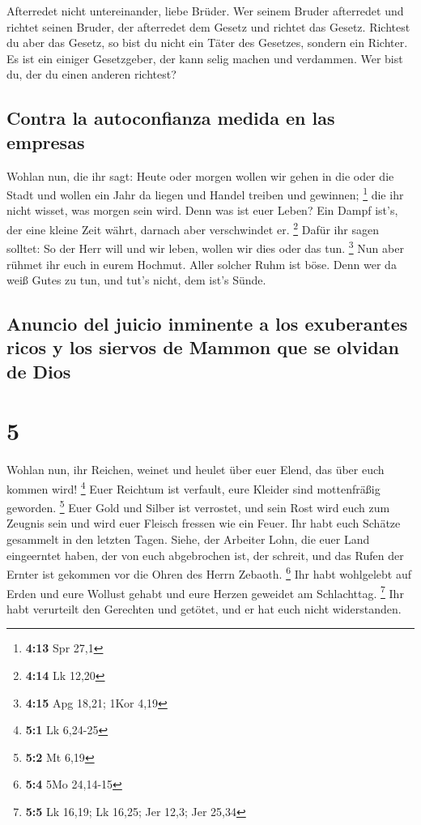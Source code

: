  Afterredet nicht untereinander, liebe Brüder. Wer seinem
Bruder afterredet und richtet seinen Bruder, der afterredet dem Gesetz
und richtet das Gesetz. Richtest du aber das Gesetz, so bist du nicht
ein Täter des Gesetzes, sondern ein Richter.  Es ist ein
einiger Gesetzgeber, der kann selig machen und verdammen. Wer bist du,
der du einen anderen richtest?

\hypertarget{contra-la-autoconfianza-medida-en-las-empresas}{%
\subsection{Contra la autoconfianza medida en las
empresas}\label{contra-la-autoconfianza-medida-en-las-empresas}}

 Wohlan nun, die ihr sagt: Heute oder morgen wollen wir
gehen in die oder die Stadt und wollen ein Jahr da liegen und Handel
treiben und gewinnen; \footnote{\textbf{4:13} Spr 27,1} 
die ihr nicht wisset, was morgen sein wird. Denn was ist euer Leben? Ein
Dampf ist's, der eine kleine Zeit währt, darnach aber verschwindet er.
\footnote{\textbf{4:14} Lk 12,20}  Dafür ihr sagen
solltet: So der Herr will und wir leben, wollen wir dies oder das tun.
\footnote{\textbf{4:15} Apg 18,21; 1Kor 4,19}  Nun aber
rühmet ihr euch in eurem Hochmut. Aller solcher Ruhm ist böse.
 Denn wer da weiß Gutes zu tun, und tut's nicht, dem
ist's Sünde.

\hypertarget{anuncio-del-juicio-inminente-a-los-exuberantes-ricos-y-los-siervos-de-mammon-que-se-olvidan-de-dios}{%
\subsection{Anuncio del juicio inminente a los exuberantes ricos y los
siervos de Mammon que se olvidan de
Dios}\label{anuncio-del-juicio-inminente-a-los-exuberantes-ricos-y-los-siervos-de-mammon-que-se-olvidan-de-dios}}

\hypertarget{section-4}{%
\section{5}\label{section-4}}

 Wohlan nun, ihr Reichen, weinet und heulet über euer
Elend, das über euch kommen wird! \footnote{\textbf{5:1} Lk 6,24-25}
 Euer Reichtum ist verfault, eure Kleider sind
mottenfräßig geworden. \footnote{\textbf{5:2} Mt 6,19} 
Euer Gold und Silber ist verrostet, und sein Rost wird euch zum Zeugnis
sein und wird euer Fleisch fressen wie ein Feuer. Ihr habt euch Schätze
gesammelt in den letzten Tagen.  Siehe, der Arbeiter Lohn,
die euer Land eingeerntet haben, der von euch abgebrochen ist, der
schreit, und das Rufen der Ernter ist gekommen vor die Ohren des Herrn
Zebaoth. \footnote{\textbf{5:4} 5Mo 24,14-15}  Ihr habt
wohlgelebt auf Erden und eure Wollust gehabt und eure Herzen geweidet am
Schlachttag. \footnote{\textbf{5:5} Lk 16,19; Lk 16,25; Jer 12,3; Jer
  25,34}  Ihr habt verurteilt den Gerechten und getötet,
und er hat euch nicht widerstanden.

